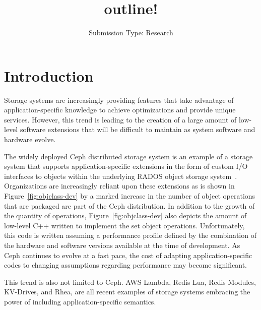 \documentclass[10pt,twocolumn]{article}
\begin{document}
\title{outline!}

\author{
\small Submission Type: Research
}

\date{}
\maketitle

\begin{abstract}
\end{abstract}

\section{Introduction}

Storage systems are increasingly providing features that take advantage of
application-specific knowledge to achieve optimizations and provide unique
services. However, this trend is leading to the creation of a large amount of
low-level software extensions that will be difficult to maintain as system
software and hardware evolve.

The widely deployed Ceph distributed storage system is an example of a storage
system that supports application-specific extensions in the form of custom I/O
interfaces to objects within the underlying RADOS object storage
system~\cite{weil:osdi06,weil:pdsw07}. Organizations are increasingly reliant
upon these extensions as is shown in Figure~\ref{fig:objclass-dev} by a marked
increase in the number of object operations that are packaged are part of the
Ceph distribution.  In addition to the growth of the quantity of operations,
Figure~\ref{fig:objclass-dev} also depicts the amount of low-level C++ written
to implement the set object operations. Unfortunately, this code is written
assuming a performance profile defined by the combination of the hardware and
software versions available at the time of development. As Ceph continues to
evolve at a fast pace, the cost of adapting application-specific codes to
changing assumptions regarding performance may become significant.


This trend is also not limited to Ceph. AWS Lambda, Redis Lua, Redis Modules,
KV-Drives, and Rhea, are all recent examples of storage systems embracing the
power of including application-specific semantics.
\end{document}
